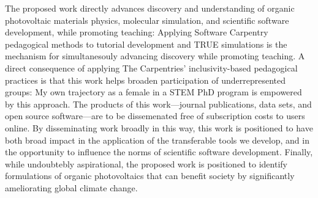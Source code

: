 The proposed work directly advances discovery and understanding of organic photovoltaic materials physics, molecular simulation, and scientific software development, while promoting teaching: Applying Software Carpentry pedagogical methods to tutorial development and TRUE simulations is the mechanism for simultanesouly advancing discovery while promoting teaching.
A direct consequence of applying The Carpentries' inclusivity-based pedagogical practices is that this work helps broaden participation of underrepresented groups: My own trajectory as a female in a STEM PhD program is empowered by this approach.
The products of this work---journal publications, data sets,  and open source software---are to be dissemenated free of subscription costs to users online.
By disseminating work broadly in this way, this work is positioned to have both broad impact in the application of the transferable tools we develop, and in the opportunity to influence the norms of scientific software development.
Finally, while undoubtebly aspirational, the proposed work is positioned to identify formulations of organic photovoltaics that can benefit society by significantly ameliorating global climate change.


